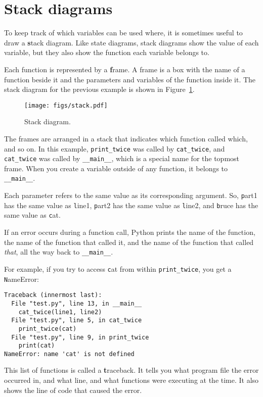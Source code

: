 \documentclass[
DIV=11,
fontsize=13,
twoside,
headinclude=false,
titlepage=firstiscover,
abstract=true,
headsepline=true,
footsepline=true,
chapterprefix=true, %
headings=big,
bibliography=totoc,%
captions=tableheading
]{scrbook}
\theoremstyle{definition}
\begin{document}
\section{Stack diagrams}
\label{stackdiagram}

To keep track of which variables can be used where, it is sometimes
useful to draw a {\textbf stack diagram}.  Like state diagrams, stack
diagrams show the value of each variable, but they also show the
function each variable belongs to.

Each function is represented by a {\textbf frame}.  A frame is a box with
the name of a function beside it and the parameters and variables of
the function inside it.  The stack diagram for the previous example is
shown in Figure~\ref{fig.stack}.

\begin{figure}
\centerline
{\texttt{[image: figs/stack.pdf]}}
\caption{Stack diagram.}
\label{fig.stack}
\end{figure}


The frames are arranged in a stack that indicates which function
called which, and so on.  In this example, \verb"print_twice"
was called by \verb"cat_twice", and \verb"cat_twice" was called by 
\verb"__main__", which is a special name for the topmost frame.  When
you create a variable outside of any function, it belongs to 
\verb"__main__".


Each parameter refers to the same value as its corresponding
argument.  So, {\texttt part1} has the same value as
{\texttt line1}, {\texttt part2} has the same value as {\texttt line2},
and {\texttt bruce} has the same value as {\texttt cat}.

If an error occurs during a function call, Python prints the
name of the function, the name of the function that called
it, and the name of the function that called {\em that}, all the
way back to \verb"__main__".

For example, if you try to access {\texttt cat} from within 
\verb"print_twice", you get a {\texttt NameError}:

\begin{lstlisting}
Traceback (innermost last):
  File "test.py", line 13, in __main__
    cat_twice(line1, line2)
  File "test.py", line 5, in cat_twice
    print_twice(cat)
  File "test.py", line 9, in print_twice
    print(cat)
NameError: name 'cat' is not defined
\end{lstlisting}
%
This list of functions is called a {\textbf traceback}.  It tells you what
program file the error occurred in, and what line, and what functions
were executing at the time.  It also shows the line of code that
caused the error.
\end{document}
